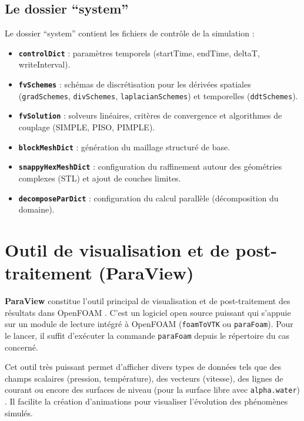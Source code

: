\subsection{Le dossier ``system''}
\label{subsec:dossier_system}

Le dossier ``system'' contient les fichiers de contrôle de la simulation \cite{jasak2009openfoam} :
\begin{itemize}
    \item \textbf{\texttt{controlDict}} : paramètres temporels (startTime, endTime, deltaT, writeInterval).
    \item \textbf{\texttt{fvSchemes}} : schémas de discrétisation pour les dérivées spatiales (\texttt{gradSchemes}, \texttt{divSchemes}, \texttt{laplacianSchemes}) et temporelles (\texttt{ddtSchemes}).
    \item \textbf{\texttt{fvSolution}} : solveurs linéaires, critères de convergence et algorithmes de couplage (SIMPLE, PISO, PIMPLE).
    \item \textbf{\texttt{blockMeshDict}} : génération du maillage structuré de base.
    \item \textbf{\texttt{snappyHexMeshDict}} : configuration du raffinement autour des géométries complexes (STL) et ajout de couches limites.
    \item \textbf{\texttt{decomposeParDict}} : configuration du calcul parallèle (décomposition du domaine).
\end{itemize}

\section{Outil de visualisation et de post-traitement (ParaView)}
\label{sec:paraview}

\textbf{ParaView} constitue l'outil principal de visualisation et de post-traitement des résultats dans OpenFOAM \cite{ahrens2005paraview}. C'est un logiciel open source puissant qui s'appuie sur un module de lecture intégré à OpenFOAM (\texttt{foamToVTK} ou \texttt{paraFoam}). Pour le lancer, il suffit d'exécuter la commande \texttt{paraFoam} depuis le répertoire du cas concerné.

Cet outil très puissant permet d'afficher divers types de données tels que des champs scalaires (pression, température), des vecteurs (vitesse), des lignes de courant ou encore des surfaces de niveau (pour la surface libre avec \texttt{alpha.water}) \cite{ayachit2015paraview}. Il facilite la création d'animations pour visualiser l'évolution des phénomènes simulés.

